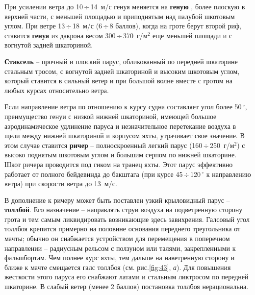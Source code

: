 \documentclass[a4paper, 12pt, twoside, final, book, russian, fittopage, cyremdash]{ncc}
\newcommand{\gr}{\ensuremath{\,^\circ}\xspace}
\newcommand{\otdo}{\,\ensuremath{\div}\,}
\newcommand{\ris}[1]{\ref{fig:#1}}
\newcommand{\gmsq}{~г/м$^2$\xspace}
\begin{document}
При усилении ветра до 10\otdo 14~м/с генуя  меняется на \textbf{геную }, более плоскую в верхней части, с меньшей площадью и приподнятым над палубой шкотовым углом. При ветре 13\otdo 18~м/с (6\otdo 8 баллов), когда на гроте берут второй риф, ставится \textbf{генуя } из дакрона весом 300\otdo 370\gmsq еще меньшей площади и с вогнутой задней шкаториной. 

\textbf{Стаксель } \--- прочный и плоский парус, обликованный по передней шкаторине стальным тросом, с вогнутой задней шкаториной и высоким шкотовым углом, который ставится в сильный ветер и при большой волне вместе с гротом на любых курсах относительно ветра.
 
Если направление ветра по отношению к курсу судна составляет угол более 50\gr, преимущество генуи с низкой нижней шкаториной, имеющей большое аэродинамическое удлинение паруса и незначительное перетекание воздуха в щели между нижней шкаториной и корпусом яхты, утрачивает свое значение. В этом случае ставится \textbf{ричер} \--- полноскроенный легкий парус (160\otdo 250\gmsq) с высоко поднятым шкотовым углом и большим серпом по нижней шкаторине. Шкот ричера проводится под гиком на транец яхты. Этот парус эффективно работает от полного бейдевинда до бакштага (при курсе 45\otdo 120\gr к направлению ветра) при скорости ветра до 13~м/с. 

В дополнение к ричеру может быть поставлен узкий крыловидный парус \--- \textbf{толлбой}. Его назначение \--- направлять струи воздуха на подветренную сторону грота и тем самым ликвидировать возникающие здесь завихрения. Галсовый угол толлбоя крепится примерно на половине основания переднего треугольника от мачты; обычно он снабжается устройством для перемещения в поперечном направлении \--- радиусным рельсом с ползуном или талями, закрепленными к фальшбортам. Чем полнее курс яхты, тем дальше на наветренную сторону и ближе к мачте смещается галс толлбоя (см. рис.\ris{43}, \textit{а}). Для повышения жесткости этого паруса его снабжают латами и стальным ликтросом по передней шкаторине. В слабый ветер (менее 2 баллов) постановка толлбоя нерациональна. 
\end{document}
